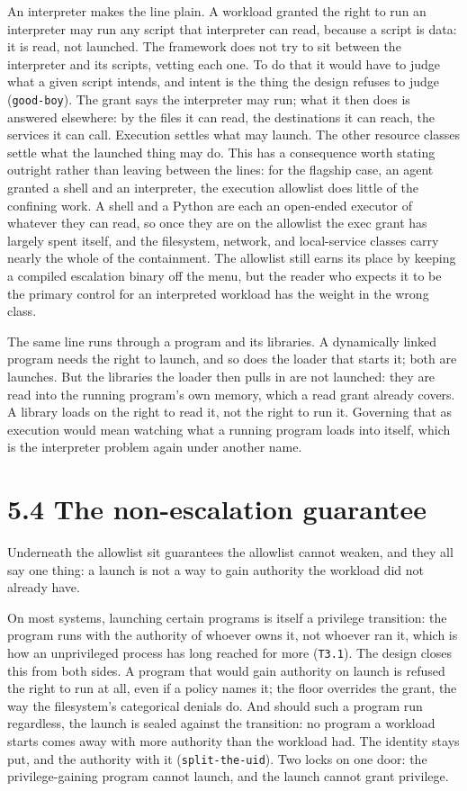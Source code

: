 An interpreter makes the line plain. A workload granted the right to run
an interpreter may run any script that interpreter can read, because a
script is data: it is read, not launched. The framework does not try to
sit between the interpreter and its scripts, vetting each one. To do
that it would have to judge what a given script intends, and intent is
the thing the design refuses to judge (\texttt{good-boy}). The grant
says the interpreter may run; what it then does is answered elsewhere:
by the files it can read, the destinations it can reach, the services it
can call. Execution settles what may launch. The other resource classes
settle what the launched thing may do. This has a consequence worth
stating outright rather than leaving between the lines: for the flagship
case, an agent granted a shell and an interpreter, the execution
allowlist does little of the confining work. A shell and a Python are
each an open-ended executor of whatever they can read, so once they are
on the allowlist the exec grant has largely spent itself, and the
filesystem, network, and local-service classes carry nearly the whole of
the containment. The allowlist still earns its place by keeping a
compiled escalation binary off the menu, but the reader who expects it
to be the primary control for an interpreted workload has the weight in
the wrong class.

The same line runs through a program and its libraries. A dynamically
linked program needs the right to launch, and so does the loader that
starts it; both are launches. But the libraries the loader then pulls in
are not launched: they are read into the running program's own memory,
which a read grant already covers. A library loads on the right to read
it, not the right to run it. Governing that as execution would mean
watching what a running program loads into itself, which is the
interpreter problem again under another name.

\hypertarget{the-non-escalation-guarantee}{%
\section{5.4 The non-escalation
guarantee}\label{the-non-escalation-guarantee}}

Underneath the allowlist sit guarantees the allowlist cannot weaken, and
they all say one thing: a launch is not a way to gain authority the
workload did not already have.

On most systems, launching certain programs is itself a privilege
transition: the program runs with the authority of whoever owns it, not
whoever ran it, which is how an unprivileged process has long reached
for more (\texttt{T3.1}). The design closes this from both sides. A
program that would gain authority on launch is refused the right to run
at all, even if a policy names it; the floor overrides the grant, the
way the filesystem's categorical denials do. And should such a program
run regardless, the launch is sealed against the transition: no program
a workload starts comes away with more authority than the workload had.
The identity stays put, and the authority with it
(\texttt{split-the-uid}). Two locks on one door: the privilege-gaining
program cannot launch, and the launch cannot grant privilege.

